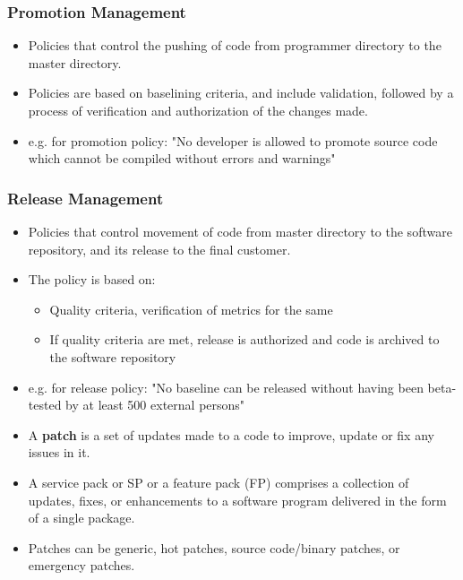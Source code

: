 \documentclass{article}
\begin{document}
\subsubsection{Promotion Management}
\begin{itemize}
    \item Policies that control the pushing of code from programmer directory to the master directory. 
    
    \item Policies are based on baselining criteria, and include validation, followed by a process of verification and authorization of the changes made. 
    
    \item e.g. for promotion policy: "No developer is allowed to promote source code which cannot be compiled without errors and warnings"
\end{itemize}

\subsubsection{Release Management}
\begin{itemize}
    \item Policies that control movement of code from master directory to the software repository, and its release to the final customer. 
    
    \item The policy is based on:
    \begin{itemize}
        \item Quality criteria, verification of metrics for the same
        
        \item If quality criteria are met, release is authorized and code is archived to the software repository
    \end{itemize}
    
    \item e.g. for release policy: "No baseline can be released without having been beta-tested by at least 500 external persons"
    
    \item A \textbf{patch} is a set of updates made to a code to improve, update or fix any issues in it. 
    
    \item A service pack or SP or a feature pack (FP) comprises a collection of updates, fixes, or enhancements to a software program delivered in the form of a single package.
    
    \item Patches can be generic, hot patches, source code/binary patches, or emergency patches.
\end{itemize}
\end{document}
